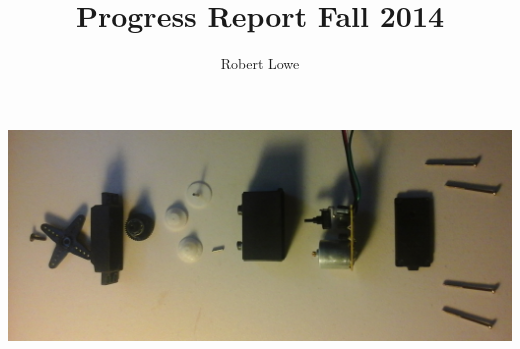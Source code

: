 \documentclass[12pt]{article}
\title{Progress Report Fall 2014}
\author{Robert Lowe}
\begin{document}
\maketitle

\includegraphics[width=\linewidth]{images/futabaExploded}
\end{document}
